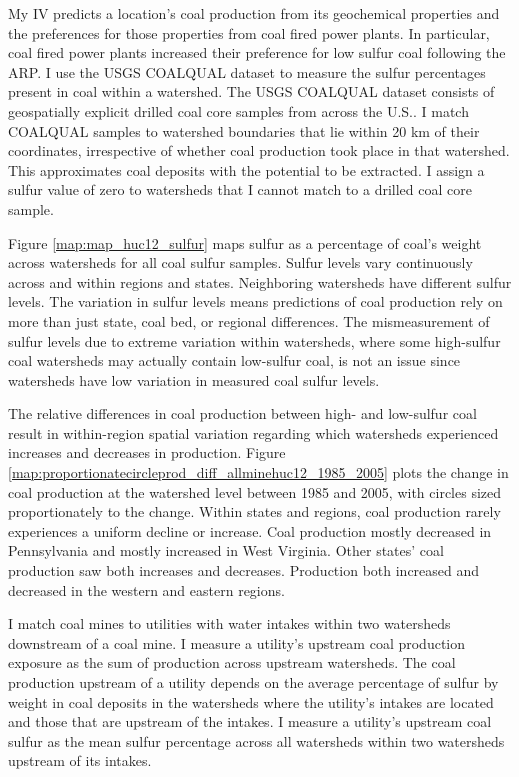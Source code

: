 \documentclass[12pt]{article}
\begin{document}
My IV predicts a location's coal production from its geochemical properties and the preferences for those properties from coal fired power plants. In particular, coal fired power plants increased their preference for low sulfur coal following the ARP. I use the USGS COALQUAL dataset to measure the sulfur percentages present in coal within a watershed. The USGS COALQUAL dataset consists of geospatially explicit drilled coal core samples from across the U.S.. I match COALQUAL samples to watershed boundaries that lie within 20 km of their coordinates, irrespective of whether coal production took place in that watershed. This approximates coal deposits with the potential to be extracted. I assign a sulfur value of zero to watersheds that I cannot match to a drilled coal core sample.  

Figure \ref{map:map_huc12_sulfur} maps sulfur as a percentage of coal's weight across watersheds for all coal sulfur samples. Sulfur levels vary continuously across and within regions and states. Neighboring watersheds have different sulfur levels. The variation in sulfur levels means predictions of coal production rely on more than just state, coal bed, or regional differences. The mismeasurement of sulfur levels due to extreme variation within watersheds, where some high-sulfur coal watersheds may actually contain low-sulfur coal, is not an issue since watersheds have low variation in measured coal sulfur levels.

The relative differences in coal production between high- and low-sulfur coal result in within-region spatial variation regarding which watersheds experienced increases and decreases in production. Figure \ref{map:proportionatecircleprod_diff_allminehuc12_1985_2005} plots the change in coal production at the watershed level between 1985 and 2005, with circles sized proportionately to the change. Within states and regions, coal production rarely experiences a uniform decline or increase. Coal production mostly decreased in Pennsylvania and mostly increased in West Virginia. Other states' coal production saw both increases and decreases. Production both increased and decreased in the western and eastern regions. 

I match coal mines to utilities with water intakes within two watersheds downstream of a coal mine. I measure a utility's upstream coal production exposure as the sum of production across upstream watersheds. The coal production upstream of a utility depends on the average percentage of sulfur by weight in coal deposits in the watersheds where the utility's intakes are located and those that are upstream of the intakes. I measure a utility's upstream coal sulfur as the mean sulfur percentage across all watersheds within two watersheds upstream of its intakes. 
\end{document}
